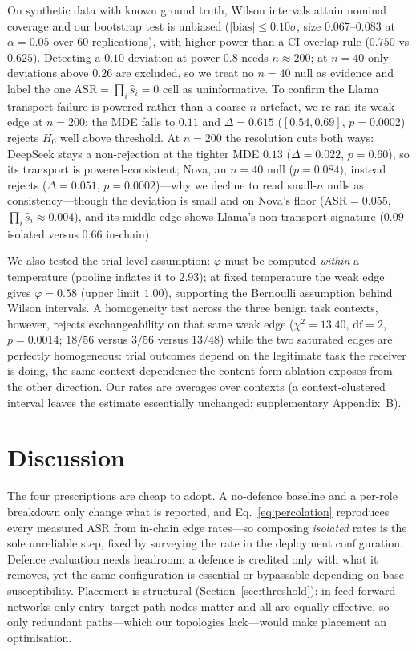 \documentclass[sigconf,anonymous]{aamas}
\begin{document}
On synthetic data with known ground truth, Wilson intervals attain nominal coverage
and our bootstrap test is unbiased ($|\mathrm{bias}| \le 0.10\sigma$, size
$0.067$--$0.083$ at $\alpha = 0.05$ over 60 replications), with higher power than a
CI-overlap rule ($0.750$ vs $0.625$). Detecting a $0.10$ deviation at power $0.8$
needs $n \approx 200$; at $n = 40$ only deviations above $0.26$ are excluded, so we
treat no $n = 40$ null as evidence and label the one $\mathrm{ASR} = \prod_i \hat s_i
= 0$ cell as uninformative. To confirm the Llama transport failure is powered rather
than a coarse-$n$ artefact, we re-ran its weak edge at $n = 200$: the MDE falls to
$0.11$ and $\Delta = 0.615$ ($[0.54, 0.69]$, $p = 0.0002$) rejects $H_0$ well above
threshold. At $n = 200$ the resolution cuts both ways: DeepSeek stays a
non-rejection at the tighter MDE $0.13$
($\Delta = 0.022$, $p = 0.60$), so its transport is powered-consistent; Nova, an
$n = 40$ null ($p = 0.084$), instead rejects ($\Delta = 0.051$, $p = 0.0002$)---why we
decline to read small-$n$ nulls as consistency---though the deviation is small and on
Nova's floor ($\mathrm{ASR} = 0.055$, $\prod_i \hat s_i \approx 0.004$), and its middle
edge shows Llama's non-transport signature ($0.09$ isolated versus $0.66$ in-chain).

We also tested the trial-level assumption: $\varphi$ must be computed \emph{within} a
temperature (pooling inflates it to $2.93$); at fixed temperature the weak edge gives
$\varphi = 0.58$ (upper limit $1.00$), supporting the Bernoulli assumption behind
Wilson intervals. A homogeneity test across the three benign task contexts, however,
rejects exchangeability on that same weak edge ($\chi^2 = 13.40$,
$\mathrm{df} = 2$, $p = 0.0014$; $18/56$ versus $3/56$ versus $13/48$) while the two
saturated edges are perfectly homogeneous: trial outcomes depend on the legitimate
task the receiver is doing, the same context-dependence the content-form ablation
exposes from the other direction. Our rates are averages over contexts (a
context-clustered interval leaves the estimate essentially unchanged;
supplementary Appendix~B).


\section{Discussion}
\label{sec:discussion}

The four prescriptions are cheap to adopt. A no-defence baseline and a per-role
breakdown only change what is reported, and Eq.~\eqref{eq:percolation} reproduces
every measured ASR from in-chain edge rates---so composing \emph{isolated} rates is
the sole unreliable step, fixed by surveying the rate in the deployment configuration.
Defence evaluation needs headroom: a defence is credited only with what it removes,
yet the same configuration is essential or bypassable depending on base
susceptibility. Placement is structural (Section~\ref{sec:threshold}): in feed-forward
networks only entry--target-path nodes matter and all are equally effective, so only
redundant paths---which our topologies lack---would make placement an optimisation.
\end{document}
